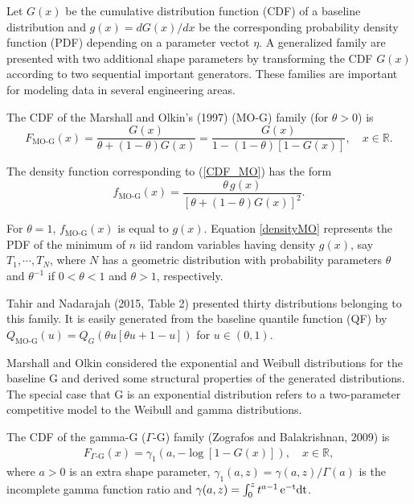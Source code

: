 \documentclass[12pt,a4paper]{article} %
\begin{document}
Let $G(x)$ be the cumulative distribution function (CDF) of a
baseline distribution and $g(x)=dG(x)/dx$ be the corresponding  probability density function (PDF) depending on a
parameter vectot $\eta$. A generalized family are presented
with two additional shape parameters by transforming the CDF $G(x)$
according to two sequential important gene\-rators. These families are important for modeling data
in several engineering areas.


The CDF of the Marshall and Olkin's (1997) ($\text{MO-G}$) family (for $\theta>0$) is
\begin{equation}\label{CDF_MO}
F_{\text{MO-G}}(x)=\frac{G(x)}{\theta+(1-\theta)G(x)}=\frac{G(x)}{1-(1-\theta)[1-G(x)]},\quad x \in \mathbb{R}.
\end{equation}

The density function corresponding to (\ref{CDF_MO}) has the form
\begin{equation}\label{densityMO}
f_{\text{MO-G}}(x)=\frac{\theta\, g(x)}{[\theta+(1-\theta)G(x)]^{2}}.
\end{equation}

For $\theta=1$, $f_{\text{MO-G}}(x)$ is equal to $g(x)$.
Equation \eqref{densityMO} represents the PDF of the minimum of $n$ iid random variables having density $g(x)$, say $T_1,\cdots,T_N$,
where $N$ has a geometric distribution with probability parameters $\theta$ and $\theta^{-1}$ if $0<\theta<1$ and $\theta>1$,
respectively.

Tahir and Nadarajah (2015, Table 2) presented thirty distributions
belonging to this family. It is easily generated from the baseline quantile function (QF) by
$Q_{\text{MO-G}}(u)=Q_{G}\left(\theta u \left[\theta u+1-u\right]\right)$ for $u\in(0,1)$.

Marshall and Olkin considered the exponential and Weibull distributions for the baseline G and derived some
structural properties of the generated distributions. The special case that G is an exponential distribution
refers to a two-parameter competitive model to the Weibull and gamma distributions.

The CDF of the gamma-G ($\Gamma$-G) family (Zografos and Balakrishnan, 2009) is
\begin{eqnarray}\label{CDF_Ga}
F_{\Gamma\text{-G}}(x)=\gamma_1\left( a, -\log \left[1-G(x)\right]\right), \quad x \in \mathbb{R},
\end{eqnarray}
where $a>0$ is an extra shape parameter,  $\gamma_1(a,z)= \gamma(a,z)/\Gamma(a)$ is the incomplete gamma function ratio
and $\gamma(a,z)=\int_0^{z} t^{a-1}\,\rm{e}^{-t}dt$.
\end{document}
